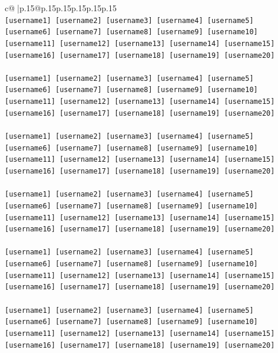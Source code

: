 \documentclass{article}
\begin{document}
{\begin{supertabular}{c@{$\;$}|p{.15\linewidth}@{}p{.15\linewidth}p{.15\linewidth}p{.15\linewidth}p{.15\linewidth}p{.15\linewidth}}
{{{\\ 
\texttt{{[}username1{]} {[}username2{]} {[}username3{]} {[}username4{]} {[}username5{]} {[}username6{]} {[}username7{]} {[}username8{]} {[}username9{]} {[}username10{]} {[}username11{]} {[}username12{]} {[}username13{]} {[}username14{]} {[}username15{]} {[}username16{]} {[}username17{]} {[}username18{]} {[}username19{]} {[}username20{]}} \\
\\ 
\texttt{{[}username1{]} {[}username2{]} {[}username3{]} {[}username4{]} {[}username5{]} {[}username6{]} {[}username7{]} {[}username8{]} {[}username9{]} {[}username10{]} {[}username11{]} {[}username12{]} {[}username13{]} {[}username14{]} {[}username15{]} {[}username16{]} {[}username17{]} {[}username18{]} {[}username19{]} {[}username20{]}} \\
\\ 
\texttt{{[}username1{]} {[}username2{]} {[}username3{]} {[}username4{]} {[}username5{]} {[}username6{]} {[}username7{]} {[}username8{]} {[}username9{]} {[}username10{]} {[}username11{]} {[}username12{]} {[}username13{]} {[}username14{]} {[}username15{]} {[}username16{]} {[}username17{]} {[}username18{]} {[}username19{]} {[}username20{]}} \\
\\ 
\texttt{{[}username1{]} {[}username2{]} {[}username3{]} {[}username4{]} {[}username5{]} {[}username6{]} {[}username7{]} {[}username8{]} {[}username9{]} {[}username10{]} {[}username11{]} {[}username12{]} {[}username13{]} {[}username14{]} {[}username15{]} {[}username16{]} {[}username17{]} {[}username18{]} {[}username19{]} {[}username20{]}} \\
\\ 
\texttt{{[}username1{]} {[}username2{]} {[}username3{]} {[}username4{]} {[}username5{]} {[}username6{]} {[}username7{]} {[}username8{]} {[}username9{]} {[}username10{]} {[}username11{]} {[}username12{]} {[}username13{]} {[}username14{]} {[}username15{]} {[}username16{]} {[}username17{]} {[}username18{]} {[}username19{]} {[}username20{]}} \\
\\ 
\texttt{{[}username1{]} {[}username2{]} {[}username3{]} {[}username4{]} {[}username5{]} {[}username6{]} {[}username7{]} {[}username8{]} {[}username9{]} {[}username10{]} {[}username11{]} {[}username12{]} {[}username13{]} {[}username14{]} {[}username15{]} {[}username16{]} {[}username17{]} {[}username18{]} {[}username19{]} {[}username20{]}} \\
\\ 
}}}
\end{supertabular}}
\end{document}
